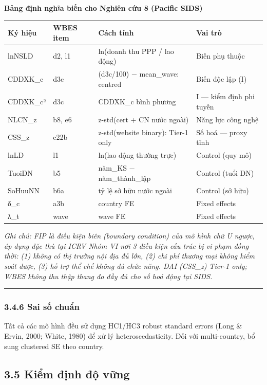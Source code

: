 \documentclass[12pt,a4paper]{article}
\begin{document}
\textbf{Bảng định nghĩa biến cho Nghiên cứu 8 (Pacific SIDS)}

\begin{longtable}[]{@{}llll@{}}
\toprule\noalign{}
Ký hiệu & WBES item & Cách tính & Vai trò \\
\midrule\noalign{}
\endhead
\bottomrule\noalign{}
\endlastfoot
lnNSLD & d2, l1 & ln(doanh thu PPP / lao động) & Biến phụ thuộc \\
CDDXK\_c & d3c & (d3c/100) − mean\_wave: centred & Biến độc lập (I) \\
CDDXK\_c² & d3c & CDDXK\_c bình phương & I --- kiểm định phi tuyến \\
NLCN\_z & b8, e6 & z-std(cert + CN nước ngoài) & Năng lực công nghệ \\
CSS\_z & c22b & z-std(website binary): Tier-1 only & Số hoá --- proxy
tĩnh \\
lnLD & l1 & ln(lao động thường trực) & Control (quy mô) \\
TuoiDN & b5 & năm\_KS − năm\_thành\_lập & Control (tuổi DN) \\
SoHuuNN & b6a & tỷ lệ sở hữu nước ngoài & Control (sở hữu) \\
δ\_c & a3b & country FE & Fixed effects \\
λ\_t & wave & wave FE & Fixed effects \\
\end{longtable}

\emph{Ghi chú: FIP là điều kiện biên (boundary condition) của mô hình
chữ U ngược, áp dụng đặc thù tại ICRV Nhóm VI nơi 3 điều kiện cấu trúc
bị vi phạm đồng thời: (1) không có thị trường nội địa đủ lớn, (2) chi
phí thương mại không kiểm soát được, (3) hỗ trợ thể chế không đủ chức
năng. DAI (CSS\_z) Tier-1 only; WBES không thu thập thang đo đầy đủ cho
số hoá động tại SIDS.}

\begin{center}\rule{0.5\linewidth}{0.5pt}\end{center}

\hypertarget{346-sai-sux1ed1-chuux1ea9n}{%
\subsubsection{3.4.6 Sai số chuẩn}\label{346-sai-sux1ed1-chuux1ea9n}}

Tất cả các mô hình đều sử dụng HC1/HC3 robust standard errors (Long \&
Ervin, 2000; White, 1980) để xử lý heteroscedasticity. Đối với
multi-country, bổ sung clustered SE theo country.

\hypertarget{35-kiux1ec3m-ux111ux1ecbnh-ux111ux1ed9-vux1eefng}{%
\subsection{3.5 Kiểm định độ
vững}\label{35-kiux1ec3m-ux111ux1ecbnh-ux111ux1ed9-vux1eefng}}
\end{document}

